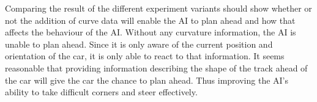 Comparing the result of the different experiment variants should show whether or not the addition of curve data will enable the AI to plan ahead and how that affects the behaviour of the AI. Without any curvature information, the AI is unable to plan ahead. Since it is only aware of the current position and orientation of the car, it is only able to react to that information. It seems reasonable that providing information describing the shape of the track ahead of the car will give the car the chance to plan ahead. Thus improving the AI's ability to take difficult corners and steer effectively. 





